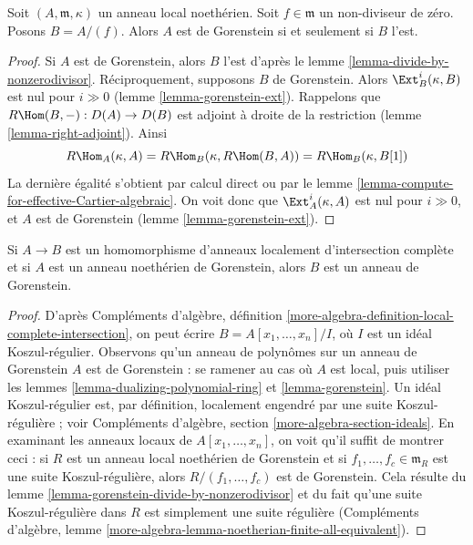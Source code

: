 \begin{lemma}
\label{lemma-gorenstein-divide-by-nonzerodivisor}
Soit $(A, \mathfrak m, \kappa)$ un anneau local noethérien. Soit $f \in \mathfrak m$ un non-diviseur de zéro.
Posons $B = A/(f)$. Alors $A$ est de Gorenstein si et seulement si $B$ l'est.
\end{lemma}

\begin{proof}
Si $A$ est de Gorenstein, alors $B$ l'est d'après le lemme \ref{lemma-divide-by-nonzerodivisor}.
Réciproquement, supposons $B$ de Gorenstein.
Alors $\Ext^i_B(\kappa, B)$ est nul pour $i \gg 0$ (lemme \ref{lemma-gorenstein-ext}).
Rappelons que $R\Hom(B, -) : D(A) \to D(B)$ est adjoint à droite de la restriction (lemme \ref{lemma-right-adjoint}).
Ainsi
$$
R\Hom_A(\kappa, A) = R\Hom_B(\kappa, R\Hom(B, A)) =
R\Hom_B(\kappa, B[1])
$$
La dernière égalité s'obtient par calcul direct ou par le lemme \ref{lemma-compute-for-effective-Cartier-algebraic}.
On voit donc que $\Ext^i_A(\kappa, A)$ est nul pour $i \gg 0$,
et $A$ est de Gorenstein (lemme \ref{lemma-gorenstein-ext}).
\end{proof}

\begin{lemma}
\label{lemma-gorenstein-lci}
Si $A \to B$ est un homomorphisme d'anneaux localement d'intersection complète
et si $A$ est un anneau noethérien de Gorenstein,
alors $B$ est un anneau de Gorenstein.
\end{lemma}

\begin{proof}
D'après Compléments d'algèbre, définition \ref{more-algebra-definition-local-complete-intersection},
on peut écrire $B = A[x_1, \ldots, x_n]/I$, où $I$ est un idéal Koszul-régulier.
Observons qu'un anneau de polynômes sur un anneau de Gorenstein $A$
est de Gorenstein : se ramener au cas où $A$ est local,
puis utiliser les lemmes \ref{lemma-dualizing-polynomial-ring} et \ref{lemma-gorenstein}.
Un idéal Koszul-régulier est, par définition, localement engendré
par une suite Koszul-régulière ; voir Compléments d'algèbre, section \ref{more-algebra-section-ideals}.
En examinant les anneaux locaux de $A[x_1, \ldots, x_n]$, on voit qu'il suffit de montrer ceci :
si $R$ est un anneau local noethérien de Gorenstein et si $f_1, \ldots, f_c \in \mathfrak m_R$
est une suite Koszul-régulière, alors $R/(f_1, \ldots, f_c)$ est de Gorenstein.
Cela résulte du lemme \ref{lemma-gorenstein-divide-by-nonzerodivisor} et du fait qu'une suite Koszul-régulière
dans $R$ est simplement une suite régulière
(Compléments d'algèbre, lemme \ref{more-algebra-lemma-noetherian-finite-all-equivalent}).
\end{proof}

